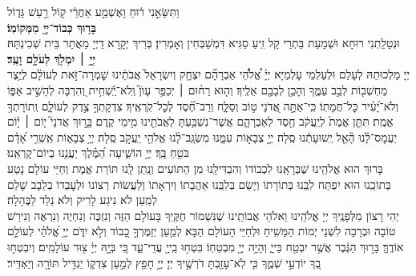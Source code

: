 \documentclass[twoside, openany, parskip=half, 11pt]{book}
\begin{document}
{וַתִּשָּׂאֵ֣נִי ר֔וּחַ וָאֶשְׁמַ֣ע אַחֲרַ֔י ק֖וֹל רַ֣עַשׁ גָּד֑וֹל\\
\kahal \textbf{בָּר֥וּךְ כְּבוֹד־יְיָ֖ מִמְּקוֹמֽוֹ׃} \\
וּנְטָלַֽתְנִי רוּחָא וּשְׁמָעֵת בַּתְרַי קָל זִֽיעַ סַגִּיא דִּמְשַׁבְּחִין וְאָמְרִין׃ בְּרִיךְ יְקָרָא דַיְיָ מֵאֲתַר בֵּית שְׁכִינְתֵּהּ׃\\
\kahal \textbf{יְיָ֥ ׀ יִמְלֹ֖ךְ לְעֹלָ֥ם וָעֶֽד׃} \\
יְיָ מַלְכוּתֵהּ לְעָלַם וּלְעַלְמֵי עָלְמַיָּא׃ יְיָ֗
%
אֱ֠לֹהֵ֠י אַבְרָהָ֞ם יִצְחָ֤ק וְיִשְׂרָאֵל֙ אֲבֹתֵ֔ינוּ שׇׁמְרָה־זֹּ֣את לְעוֹלָ֔ם לְיֵ֥צֶר מַחְשְׁב֖וֹת לְבַ֣ב עַמֶּ֑ךָ וְהָכֵ֥ן לְבָבָ֖ם אֵלֶֽיךָ׃ וְה֤וּא
%
רַח֨וּם ׀ יְכַפֵּ֥ר עָוֺן֮ וְֽלֹא־יַֽ֫שְׁחִ֥ית וְ֭הִרְבָּה לְהָשִׁ֣יב אַפּ֑וֹ וְלֹא־יָ֝עִ֗יר כׇּל־חֲמָתֽוֹ׃ כִּֽי־אַתָּ֣ה
%
אֲ֭דֹנָי ט֣וֹב וְסַלָּ֑ח וְרַב־חֶ֗֝סֶד לְכׇל־קֹֽרְאֶֽיךָ׃ צִדְקָתְךָ֣
%
צֶ֣דֶק לְעוֹלָ֑ם וְֽתוֹרָתְךָ֥ אֱמֶֽת׃ תִּתֵּ֤ן
%
אֱמֶת֙ לְיַֽעֲקֹ֔ב חֶ֖סֶד לְאַבְרָהָ֑ם אֲשֶׁר־נִשְׁבַּ֥עְתָּ לַאֲבֹתֵ֖ינוּ מִ֥ימֵי קֶֽדֶם׃ בָּ֤ר֣וּךְ
%
אֲדֹנָי֮ י֤וֹם ׀ י֥֫וֹם יַעֲמׇס־לָ֗נוּ הָ֘אֵ֤ל יְֽשׁוּעָתֵ֬נוּ סֶֽלָה׃ יְיָ֣
%
צְבָא֣וֹת עִמָּ֑נוּ מִשְׂגָּֽב־לָ֨נוּ אֱלֹהֵ֖י יַֽעֲקֹ֣ב סֶֽלָה׃ יְיָ֥
%
צְבָא֑וֹת אַֽשְׁרֵ֥י אָ֝דָ֗ם בֹּטֵ֥חַ בָּֽךְ׃ יְיָ֥
%
הוֹשִׁ֑יעָה הַ֝מֶּ֗לֶךְ יַעֲנֵ֥נוּ בְיוֹם־קׇרְאֵֽנוּ׃ \\
בָּרוּךְ הוּא אֱלֹהֵֽינוּ שֶׁבְּרָאָֽנוּ לִכְבוֹדוֹ וְהִבְדִּילָֽנוּ מִן הַתּוֹעִים וְנָֽתַן לָֽנוּ תּוֹרַת אֱמֶת וְחַיֵּי עוֹלָם נָטַע בְּתוֹכֵֽנוּ הוּא יִפְתַּח לִבֵּֽנוּ בְּתוֹרָתוֹ וְיָשֵׂם בְּלִבֵּֽנוּ אַהֲבָתוֹ וְיִרְאָתוֹ וְלַעֲשׂוֹת רְצוֹנוֹ וּלְעׇבְדוֹ בְלֵבָב שָׁלֵם לְמַֽעַן לֹא נִיגַע לָרִיק וְלֹא נֵלֵד לַבֶּהָלָה׃\\
יְהִי רָצוֹן מִלְּפָנֶֽיךָ יְיָ אֱלֹהֵֽינוּ וֵאלֹהֵי אֲבוֹתֵֽינוּ שֶׁנִּשְׁמוֹר חֻקֶּֽיךָ בָּעוֹלָם הַזֶּה וְנִזְכֶּה וְנִחְיֶה וְנִרְאֶה וְנִירַשׁ טוֹבָה וּבְרָכָה לִשְׁנֵי יְמוֹת הַמָּשִֽׁיחַ וּלְחַיֵּי הָעוֹלָם הַבָּא׃ לְמַ֤עַן יְזַמֶּרְךָ֣ כָ֭בוֹד וְלֹ֣א יִדֹּ֑ם יְיָ֥ אֱ֝לֹהַ֗י לְעוֹלָ֣ם אוֹדֶֽךָּ׃ בָּר֣וּךְ הַגֶּ֔בֶר אֲשֶׁ֥ר יִבְטַ֖ח בַּייָ֑ וְהָיָ֥ה יְיָ֖ מִבְטַחֽוֹ׃ בִּטְח֥וּ
%
בַֽייָ֖ עֲדֵי־עַ֑ד כִּ֚י בְּיָ֣הּ יְיָ֔ צ֖וּר עוֹלָמִֽים׃ וְיִבְטְח֣וּ
%
בְ֭ךָ יוֹדְעֵ֣י שְׁמֶ֑ךָ כִּ֤י לֹֽא־עָזַ֖בְתָּ דֹרְשֶׁ֣יךָ יְיָ׃ יְיָ֥
%
חָפֵ֖ץ לְמַ֣עַן צִדְק֑וֹ יַגְדִּ֥יל תּוֹרָ֖ה וְיַאְדִּֽיר׃
}


\newcommand{\uvaletzion}{
\firstword{וּבָ֤א לְצִיּוֹן֙}\source{ישעיה נט}
גּוֹאֵ֔ל וּלְשָׁבֵ֥י פֶ֖שַׁע בְּיַֽעֲקֹ֑ב נְאֻ֖ם יְיָ׃ וַאֲנִ֗י זֹ֣את בְּרִיתִ֤י אוֹתָם֙ אָמַ֣ר יְיָ֔ רוּחִי֙ אֲשֶׁ֣ר עָלֶ֔יךָ וּדְבָרַ֖י אֲשֶׁר־שַׂ֣מְתִּי בְּפִ֑יךָ לֹֽא־יָמ֡וּשׁוּ מִפִּ֩יךָ֩ וּמִפִּ֨י זַרְעֲךָ֜ וּמִפִּ֨י זֶ֤רַע זַרְעֲךָ֙ אָמַ֣ר יְיָ֔ מֵעַתָּ֖ה וְעַד־עוֹלָֽם׃
\kedushadesidra
}
\end{document}

